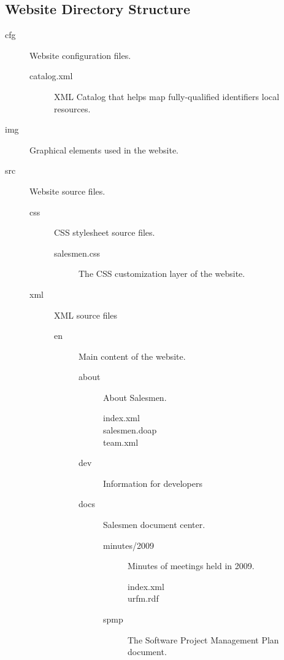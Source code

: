 \subsection{Website Directory Structure}\label{WebsiteDirectoryStructure}

\begin{description}
\item[cfg] Website configuration files.
  \begin{description}
  \item[catalog.xml] XML Catalog that helps map fully-qualified identifiers
    local resources.
  \end{description}
\item[img] Graphical elements used in the website.
\item[src] Website source files.
  \begin{description}
  \item[css] CSS stylesheet source files.
    \begin{description}
    \item[salesmen.css] The CSS customization layer of the website.
    \end{description}
  \item[xml] XML source files
    \begin{description}
    \item[en] Main content of the website.
      \begin{description}
      \item[about] About Salesmen.
        \begin{description}
        \item[index.xml]
        \item[salesmen.doap]
        \item[team.xml]
        \end{description}
      \item[dev] Information for developers
      \item[docs] Salesmen document center.
        \begin{description}
        \item[minutes/2009] Minutes of meetings held in 2009.
          \begin{description}
          \item[index.xml]
          \item[urfm.rdf]
          \end{description}
        \item[spmp] The Software Project Management Plan document.

\end{description}
\end{description}
\end{description}
\end{description}
\end{description}
